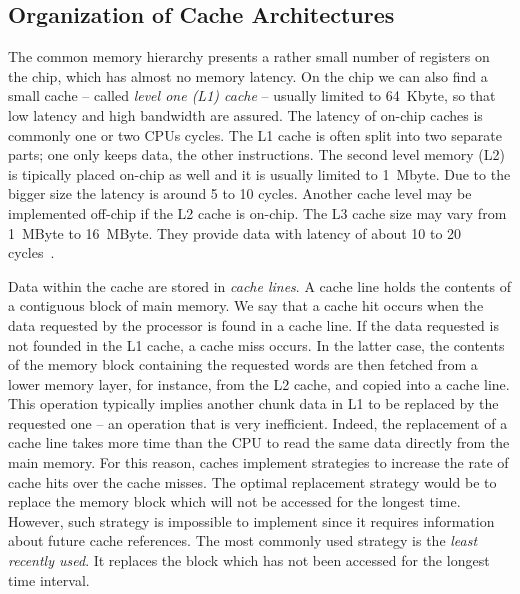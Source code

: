 \subsection{Organization of Cache Architectures}
The common memory hierarchy presents a rather small number of registers on the chip, which has almost no memory latency. On the chip we can also find a small cache -- called \textit{level one (L1) cache} -- usually limited to 64~Kbyte, so that low latency and high bandwidth are assured. The latency of on-chip caches is commonly one or two CPUs cycles. The L1 cache is often split into two separate parts; one only keeps data, the other instructions. The second level memory (L2) is tipically placed on-chip as well and it is usually limited to 1~Mbyte. Due to the bigger size the  latency is around 5 to 10 cycles. Another cache level may be implemented off-chip if the L2 cache is on-chip. The L3 cache size may vary from 1~MByte to 16~MByte. They provide data with latency of about 10 to 20 cycles~\citep{Hennessy-Patterson}.

Data within the cache are stored in \textit{cache lines}. A cache line holds the contents of a contiguous block of main memory. We say that a cache hit occurs when the data requested by the processor is found in a cache line. If the data requested is not founded in the L1 cache, a cache miss occurs. In the latter case, the contents of the memory block containing the requested words are then fetched from a lower memory layer, for instance, from the L2 cache, and copied into a cache line. This operation typically implies another chunk data in L1 to be replaced by the requested one -- an operation that is very inefficient. Indeed, the replacement of a cache line takes more time than the CPU to read the same data directly from the main memory. For this reason, caches implement strategies to increase the rate of cache hits  over the cache misses. The optimal replacement strategy would be to replace the memory block which will not be accessed for the longest time. However, such strategy is impossible to implement since it requires information about future cache references. 
The most commonly used strategy is the \textit{least recently used}. It replaces the block which has not been accessed for the longest time interval.

 

